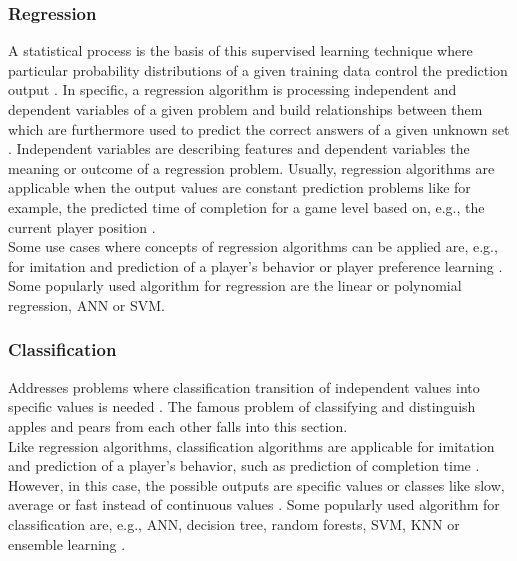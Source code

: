 \documentclass[MGS,Master,english]{twbook}%
\begin{document}
\subsubsection{Regression}
A statistical process is the basis of this supervised learning technique where particular probability distributions of a given training data control the prediction output \cite{ml::book::developer}. In specific, a regression algorithm is processing independent and dependent variables of a given problem and build relationships between them which are furthermore used to predict the correct answers of a given unknown set \cite{ml::book::developer}. Independent variables are describing features and dependent variables the meaning or outcome of a regression problem. Usually, regression algorithms are applicable when the output values are constant prediction problems like for example, the predicted time of completion for a game level based on, e.g., the current player position \cite{ai::book}.\\
Some use cases where concepts of regression algorithms can be applied are, e.g., for imitation and prediction of a player's behavior or player preference learning \cite{ai::book}. Some popularly used algorithm for regression are the linear or polynomial regression, \ac{ANN} or \ac{SVM}. \cite{ai::book}

\subsubsection{Classification}
Addresses problems where classification transition of independent values into specific values is needed \cite{ai::book}. The famous problem of classifying and distinguish apples and pears from each other falls into this section.\\
Like regression algorithms, classification algorithms are applicable for imitation and prediction of a player's behavior, such as prediction of completion time \cite{ai::book}. However, in this case, the possible outputs are specific values or classes like slow, average or fast instead of continuous values \cite{ai::book}. Some popularly used algorithm for classification are, e.g., \ac{ANN}, decision tree, random forests, \ac{SVM}, \ac{KNN} or ensemble learning \cite{ai::book}.
\end{document}
